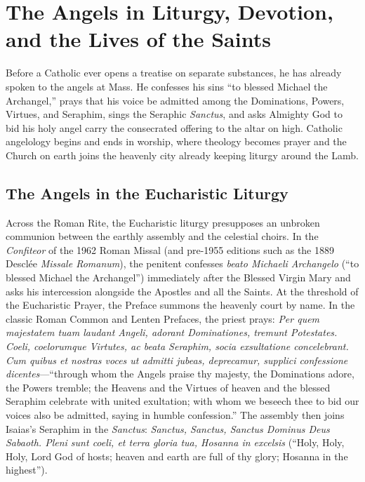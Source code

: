 \section{The Angels in Liturgy, Devotion, and the Lives of the Saints}

Before a Catholic ever opens a treatise on separate substances, he has already spoken to the angels at Mass. He confesses his sins ``to blessed Michael the Archangel,'' prays that his voice be admitted among the Dominations, Powers, Virtues, and Seraphim, sings the Seraphic \emph{Sanctus}, and asks Almighty God to bid his holy angel carry the consecrated offering to the altar on high. Catholic angelology begins and ends in worship, where theology becomes prayer and the Church on earth joins the heavenly city already keeping liturgy around the Lamb.

\subsection{The Angels in the Eucharistic Liturgy}

Across the Roman Rite, the Eucharistic liturgy presupposes an unbroken communion between the earthly assembly and the celestial choirs. In the \emph{Confiteor} of the 1962 Roman Missal (and pre-1955 editions such as the 1889 Descl\'ee \emph{Missale Romanum}), the penitent confesses \emph{beato Michaeli Archangelo} (``to blessed Michael the Archangel'') immediately after the Blessed Virgin Mary and asks his intercession alongside the Apostles and all the Saints. At the threshold of the Eucharistic Prayer, the Preface summons the heavenly court by name. In the classic Roman Common and Lenten Prefaces, the priest prays: \emph{Per quem majestatem tuam laudant Angeli, adorant Dominationes, tremunt Potestates. Coeli, coelorumque Virtutes, ac beata Seraphim, socia exsultatione concelebrant. Cum quibus et nostras voces ut admitti jubeas, deprecamur, supplici confessione dicentes}---``through whom the Angels praise thy majesty, the Dominations adore, the Powers tremble; the Heavens and the Virtues of heaven and the blessed Seraphim celebrate with united exultation; with whom we beseech thee to bid our voices also be admitted, saying in humble confession.'' The assembly then joins Isaias's Seraphim in the \emph{Sanctus}: \emph{Sanctus, Sanctus, Sanctus Dominus Deus Sabaoth. Pleni sunt coeli, et terra gloria tua, Hosanna in excelsis} (``Holy, Holy, Holy, Lord God of hosts; heaven and earth are full of thy glory; Hosanna in the highest'').

